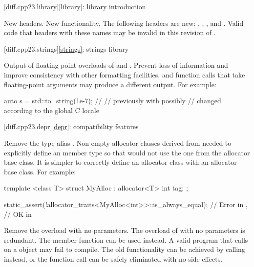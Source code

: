 [diff.cpp23.library]{\ref{library}: library introduction}

\change
New headers.
\rationale
New functionality.
\effect
The following \Cpp{} headers are new:
,
,
, and
.
Valid \CppXXIII{} code that  headers with these names may be
invalid in this revision of \Cpp{}.

[diff.cpp23.strings]{\ref{strings}: strings library}

\change
Output of floating-point overloads of  and .
\rationale
Prevent loss of information and improve consistency with other formatting
facilities.
\effect
{} and  function calls that take
floating-point arguments may produce a different output.
For example:
\begin{codeblock}
auto s = std::to_string(1e-7);  // 
                                // previously  with  possibly
                                // changed according to the global C locale
\end{codeblock}

[diff.cpp23.depr]{\ref{depr}: compatibility features}

\nodiffref
\change
Remove the type alias .
\rationale
Non-empty allocator classes derived from  needed to explicitly
define an  member type so that 
would not use the one from the allocator base class.
\effect
It is simpler to correctly define an allocator class with an allocator base
class. For example:
\begin{codeblock}
template <class T>
struct MyAlloc : allocator<T> {
  int tag;
};

static_assert(!allocator_traits<MyAlloc<int>>::is_always_equal);        // Error in \CppXXIII{},
                                                                        // OK in \CppXXVI{}
\end{codeblock}

\nodiffref
\change
Remove the  overload with no parameters.
\rationale
The overload of  with no parameters is redundant.
The  member function can be used instead.
\effect
A valid \CppXXIII{} program that calls 
on a  object may fail to compile.
The old functionality can be achieved by calling  instead,
or the function call can be safely eliminated with no side effects.


